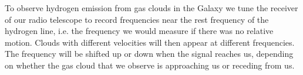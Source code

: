 To observe hydrogen emission from gas clouds in the Galaxy we tune the receiver
of our radio telescope to record frequencies near the rest frequency of the
hydrogen line, i.e. the frequency we would measure if there was no relative
motion. Clouds with different velocities will then appear at different
frequencies. The frequency will be shifted up or down when the signal reaches
us, depending on whether the gas cloud that we observe is approaching us or
receding from us. 
